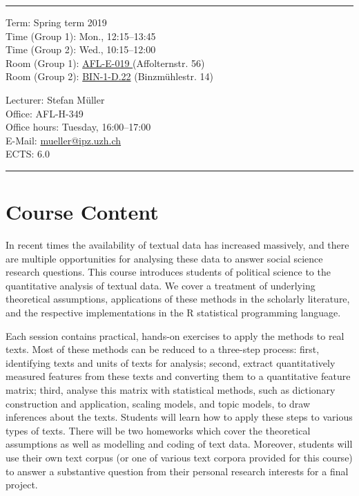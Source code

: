 \documentclass[abstract=on,parskip=full,headings=standardclasses,fontsize=11pt,paper=a4]{scrartcl}
\begin{document}
\hrule
\medskip
\begin{minipage}[t]{0.5\textwidth}
Term: Spring term 2019 \\
Time (Group 1):  Mon., 12:15--13:45 \\
Time (Group 2): Wed., 10:15--12:00 \\
Room (Group 1): \href{https://www.plaene.uzh.ch/AFL}{AFL-E-019 } (Affolternstr. 56) \\
Room (Group 2):  \href{https://www.plaene.uzh.ch/BIN}{BIN-1-D.22} (Binzmühlestr. 14)
\end{minipage}
\begin{minipage}[t]{0.49\textwidth}
\begin{flushright}
Lecturer: Stefan Müller \\
Office:  AFL-H-349\\
Office hours: Tuesday, 16:00--17:00 \\
E-Mail: \textsf{\href{mailto:mueller@ipz.uzh.ch}{mueller@ipz.uzh.ch}} \\
ECTS: 6.0
\end{flushright}
\end{minipage}
\medskip
\vspace{2.5mm}
\hrule 

\section*{Course Content}

In recent times the availability of textual data has increased massively, and there are multiple opportunities for analysing these data to answer social science research questions. This course introduces students of political science to the quantitative analysis of textual data. We cover a treatment of underlying theoretical assumptions, applications of these methods in the scholarly literature, and the respective implementations in the \textsf{R} statistical programming language.

Each session  contains practical, hands-on exercises to apply the methods to real texts. Most of these methods can be reduced to a three-step process: first, identifying texts and units of texts for analysis; second, extract quantitatively measured features from these texts and converting them to a quantitative feature matrix; third, analyse this matrix with statistical methods, such as dictionary construction and application, scaling models, and topic models, to draw inferences about the texts. Students will learn how  to apply these steps to various types of texts. There will be two homeworks which cover the theoretical assumptions as well as modelling and coding of text data. Moreover, students will use their own text corpus (or one of various text corpora provided for this course) to answer a substantive question from their personal research interests for a final project.
\end{document}
